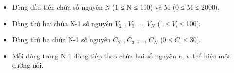 \begin{itemize}
	\item Dòng đầu tiên chứa số nguyên N (1 ≤ N ≤ 100) và M (0 ≤ M ≤ 2000).
	\item Dòng thứ hai chứa N-1 số nguyên $V_{2}$ , $V_{3}$ ..., $V_{N}$ (1 ≤ $V_{i}$ ≤ 100).
	\item Dòng thứ ba chứa N-1 số nguyên $C_{2}$ , $C_{3}$ ,..., $C_{N}$ (0 ≤ $C_{i}$ ≤ 30).
	\item Mỗi dòng trong N-1 dòng tiếp theo chứa hai số nguyên u, v thể hiện một đường nối.
\end{itemize}